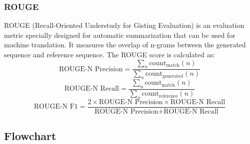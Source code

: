 \subsubsection{ROUGE}
ROUGE (Recall-Oriented Understudy for Gisting Evaluation) is an evaluation metric
specially designed for automatic summarization that can be used for machine
translation. It measures the overlap of n-grams between the generated sequence and
reference sequence. The ROUGE score is calculated as:
\begin{equation}
\text{ROUGE-N Precision} = \frac{\sum_{n}\text{count}_{\text{match}}(n)}{\sum_{n}\text{count}_{\text{generated}}(n)}
\end{equation}
\begin{equation}
\text{ROUGE-N Recall} = \frac{\sum_{n}\text{count}_{\text{match}}(n)}{\sum_{n}\text{count}_{\text{reference}}(n)}
\end{equation}
\begin{equation}
\text{ROUGE-N F1} = \frac{2 \times \text{ROUGE-N Precision} \times \text{ROUGE-N Recall}}{\text{ROUGE-N Precision} + \text{ROUGE-N Recall}}
\end{equation}





\subsection{Flowchart}

